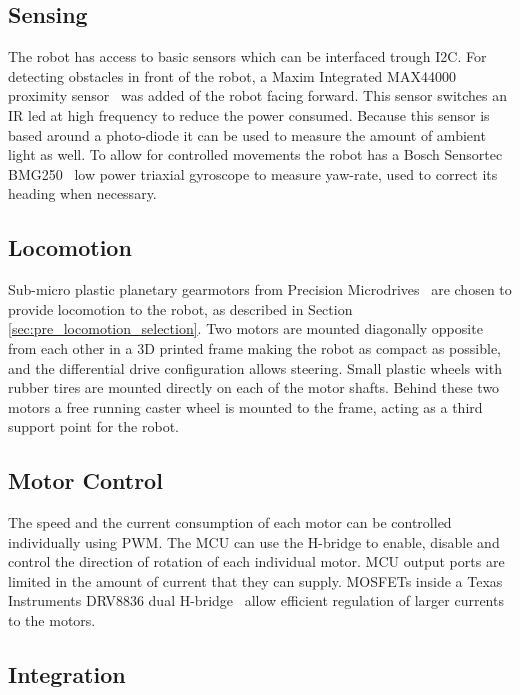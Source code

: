\subsection{Sensing}
\label{sec:dai_sensing}

The robot has access to basic sensors which can be interfaced trough I2C.
For detecting obstacles in front of the robot, a Maxim Integrated MAX44000 proximity sensor~\cite{max44000_2017} was added of the robot facing forward.
This sensor switches an IR led at high frequency to reduce the power consumed.
Because this sensor is based around a photo-diode it can be used to measure the amount of ambient light as well.
To allow for controlled movements the robot has a Bosch Sensortec BMG250~\cite{bosch_bmg250_2017} low power triaxial gyroscope to measure yaw-rate, used to correct its heading when necessary.

\subsection{Locomotion}

Sub-micro plastic planetary gearmotors from Precision Microdrives~\cite{gearmotor_206-110_2017} are chosen to provide locomotion to the robot, as described in Section \ref{sec:pre_locomotion_selection}.
Two motors are mounted diagonally opposite from each other in a 3D printed frame making the robot as compact as possible, and the differential drive configuration allows steering.
Small plastic wheels with rubber tires are mounted directly on each of the motor shafts.
Behind these two motors a free running caster wheel is mounted to the frame, acting as a third support point for the robot.

\subsection{Motor Control}
\label{sec:dai_motor_control}

The speed and the current consumption of each motor can be controlled individually using PWM.
The MCU can use the H-bridge to enable, disable and control the direction of rotation of each individual motor.
MCU output ports are limited in the amount of current that they can supply.
MOSFETs inside a Texas Instruments DRV8836 dual H-bridge~\cite{drv8836_2017} allow efficient regulation of larger currents to the motors.

\subsection{Integration}


